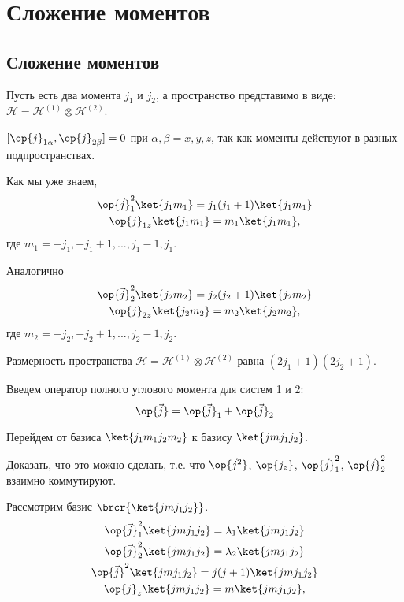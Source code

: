 \chapter{Сложение моментов}

\section{Сложение моментов}

Пусть есть два момента $j_1$ и $j_2$, а пространство представимо в виде: $\mathcal{H} = \mathcal{H}^{(1)} \otimes \mathcal{H}^{(2)}$.

$[\op{j}_{1 \alpha}, \op{j}_{2 \beta}] = 0$ при $\alpha, \beta = x, y, z$, так как моменты действуют в разных подпространствах.

Как мы уже знаем, 
\begin{gather*}
\op{\vec{j}}_1^2\ket{j_1 m_1} = j_1(j_1 + 1)\ket{j_1 m_1}  \\
\op{j}_{1z} \ket{j_1 m_1} = m_1\ket{j_1 m_1}, 
\end{gather*}
где $m_1 = -j_1, -j_1 + 1, ... , j_1 - 1, j_1$.

Аналогично
\begin{gather*}
\op{\vec{j}}_2^2\ket{j_2 m_2} = j_2(j_2 + 1)\ket{j_2 m_2}  \\
\op{j}_{2z} \ket{j_2 m_2} = m_2\ket{j_2 m_2}, 
\end{gather*}
где $m_2 = -j_2, -j_2 + 1, ... , j_2 - 1, j_2$.

Размерность пространства $\mathcal{H} = \mathcal{H}^{(1)} \otimes \mathcal{H}^{(2)}$ равна $(2j_1 + 1)(2j_2 + 1)$.

Введем оператор полного углового момента для систем 1 и 2:
$$
\op{\vec{j}} = \op{\vec{j}}_1 + \op{\vec{j}}_2
$$

Перейдем от базиса $\ket{j_1 m_1 j_2 m_2}$ к базису $\ket{j m j_1 j_2}$. 

\begin{excr}
Доказать, что это можно сделать, т.е. что $\op{\vec{j}^2}$, $\op{j_z}$, $\op{\vec{j}}_1^2$, $\op{\vec{j}}_2^2$ взаимно коммутируют.
\end{excr}

Рассмотрим базис $\brcr{\ket{j m j_1 j_2}}$.
\begin{gather*}
\op{\vec{j}}_1^2\ket{j m j_1 j_2} = \lambda_1 \ket{j m j_1 j_2}  \\
\op{\vec{j}}_2^2\ket{j m j_1 j_2} = \lambda_2 \ket{j m j_1 j_2}  \\
\op{\vec{j}}^2\ket{j m j_1 j_2} = j(j+1) \ket{j m j_1 j_2}  \\
\op{j}_{z} \ket{j m j_1 j_2} = m \ket{j m j_1 j_2}, 
\end{gather*}

